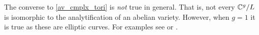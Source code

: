 \documentclass[11pt]{article}
\begin{document}
\begin{warn}
	The converse to \autoref{av_cmplx_tori} is \emph{not} true in general. That is, not every $\mathbb{C}^g/L$ is isomorphic to the analytification of an abelian variety. However, when $g=1$ it is true as these are elliptic curves. For examples see \cite[Pg.~104]{siegel2008analytic} or \cite[Ch.~VIII.1.4-5]{2012basic}.
\end{warn}

%	
%	
%	
%	
%			
\end{document}
